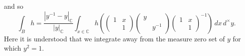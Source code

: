 \documentclass[reqno]{amsart} 
\begin{document}
and so
\begin{equation}\label{eqn:}
  \int_B h
  =
  \frac {|y^{-1} - y|_{\mathbb{C}}}{|y|_{\mathbb{C}}}
  \int_{x \in \mathbb{C}}
  h (
\begin{pmatrix}
    1 & x \\
    & 1
  \end{pmatrix} 
\begin{pmatrix}
    y &  \\
    & y^{-1}
  \end{pmatrix}
  \begin{pmatrix}
    1 & x \\
    & 1
  \end{pmatrix}
  ^{-1} ) \, d x \, d^\times y.
\end{equation}
Here it is understood that we integrate away from the measure zero set of $y$ for which $y^2 = 1$.
\end{document}
